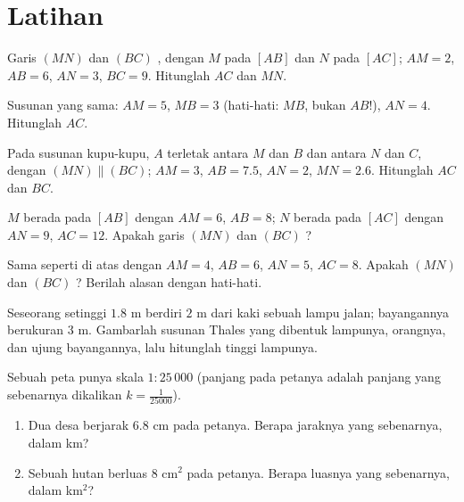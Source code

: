 \section{Latihan}

\begin{exercise}[$\star$]\label{exo:g9:thales:1}
Garis $(MN)$ dan $(BC)$ , dengan $M$ pada $[AB]$ dan $N$ pada
$[AC]$; $AM = 2$, $AB = 6$, $AN = 3$, $BC = 9$. Hitunglah $AC$ dan $MN$.
\end{exercise}

\begin{exercise}[$\star$]\label{exo:g9:thales:2}
Susunan yang sama: $AM = 5$, $MB = 3$ (hati-hati: $MB$, bukan $AB$!),
$AN = 4$. Hitunglah $AC$.
\end{exercise}

\begin{exercise}[$\star$]\label{exo:g9:thales:3}
Pada susunan kupu-kupu, $A$ terletak antara $M$ dan $B$ dan antara $N$
dan $C$, dengan $(MN) \parallel (BC)$; $AM = 3$, $AB = 7.5$, $AN = 2$,
$MN = 2.6$. Hitunglah $AC$ dan $BC$.
\end{exercise}

\begin{exercise}[$\star$]\label{exo:g9:thales:4}
$M$ berada pada $[AB]$ dengan $AM = 6$, $AB = 8$; $N$ berada pada
$[AC]$ dengan $AN = 9$, $AC = 12$. Apakah garis $(MN)$ dan $(BC)$ ?
\end{exercise}

\begin{exercise}[$\star\star$]\label{exo:g9:thales:5}
Sama seperti di atas dengan $AM = 4$, $AB = 6$, $AN = 5$, $AC = 8$.
Apakah $(MN)$ dan $(BC)$ ? Berilah alasan dengan hati-hati.
\end{exercise}

\begin{exercise}[$\star\star$]\label{exo:g9:thales:6}
Seseorang setinggi $1.8$ m berdiri $2$ m dari kaki sebuah lampu jalan;
bayangannya berukuran $3$ m. Gambarlah susunan Thales yang dibentuk
lampunya, orangnya, dan ujung bayangannya, lalu hitunglah tinggi
lampunya.
\end{exercise}

\begin{exercise}[$\star\star$]\label{exo:g9:thales:7}
Sebuah peta punya skala $1 : 25\,000$ (panjang pada petanya adalah
panjang yang sebenarnya dikalikan $k = \frac{1}{25000}$).
\begin{enumerate}
  \item Dua desa berjarak $6.8$ cm pada petanya. Berapa jaraknya yang
        sebenarnya, dalam km?
  \item Sebuah hutan berluas $8$ cm$^2$ pada petanya. Berapa luasnya
        yang sebenarnya, dalam km$^2$?
\end{enumerate}
\end{exercise}

